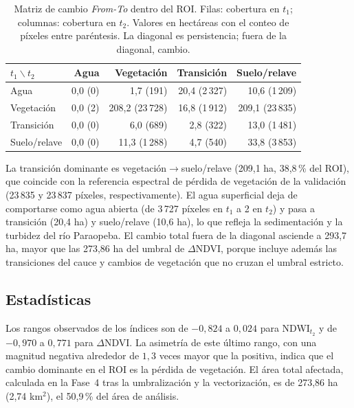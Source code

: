 \documentclass[12pt]{article}
\begin{document}
\begin{table}[H]
 \centering
 \caption{Matriz de cambio \emph{From-To} dentro del ROI. Filas: cobertura en $t_1$; columnas: cobertura en $t_2$. Valores en hectáreas con el conteo de píxeles entre paréntesis. La diagonal es persistencia; fuera de la diagonal, cambio.}
 \label{tab:fromto}
 \begin{tabular}{lrrrr}
  \toprule
  $t_1 \backslash t_2$ & \textbf{Agua} & \textbf{Vegetación} & \textbf{Transición} & \textbf{Suelo/relave} \\
  \midrule
  Agua         & 0{,}0 (0)         & 1{,}7 (191)       & 20{,}4 (2\,327) & 10{,}6 (1\,209) \\
  Vegetación   & 0{,}0 (2)         & 208{,}2 (23\,728) & 16{,}8 (1\,912) & 209{,}1 (23\,835) \\
  Transición   & 0{,}0 (0)         & 6{,}0 (689)       & 2{,}8 (322)     & 13{,}0 (1\,481) \\
  Suelo/relave & 0{,}0 (0)         & 11{,}3 (1\,288)   & 4{,}7 (540)     & 33{,}8 (3\,853) \\
  \bottomrule
 \end{tabular}
\end{table}

La transición dominante es vegetación$\rightarrow$suelo/relave (209{,}1 ha, 38{,}8\,\% del ROI), que coincide con la referencia espectral de pérdida de vegetación de la validación (23\,835 y 23\,837 píxeles, respectivamente). El agua superficial deja de comportarse como agua abierta (de 3\,727 píxeles en $t_1$ a 2 en $t_2$) y pasa a transición (20{,}4 ha) y suelo/relave (10{,}6 ha), lo que refleja la sedimentación y la turbidez del río Paraopeba. El cambio total fuera de la diagonal asciende a 293{,}7 ha, mayor que las 273{,}86 ha del umbral de $\Delta$NDVI, porque incluye además las transiciones del cauce y cambios de vegetación que no cruzan el umbral estricto.

\subsection{Estadísticas}
Los rangos observados de los índices son de $-0{,}824$ a $0{,}024$ para NDWI$_{t_2}$ y de $-0{,}970$ a $0{,}771$ para $\Delta$NDVI. La asimetría de este último rango, con una magnitud negativa alrededor de $1{,}3$ veces mayor que la positiva, indica que el cambio dominante en el ROI es la pérdida de vegetación. El área total afectada, calculada en la Fase~4 tras la umbralización y la vectorización, es de 273{,}86 ha (2{,}74 km$^2$), el 50{,}9\,\% del área de análisis.
\end{document}
